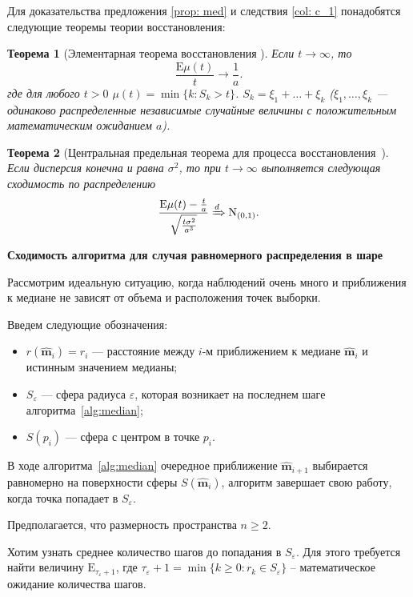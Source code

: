 \documentclass[specialist,
substylefile = spbu.rtx,
               subf,href,colorlinks=true, 12pt]{disser}
\newtheorem{theorem}{Теорема}
\begin{document}
Для доказательства предложения \ref{prop: med} и следствия \ref{col: c_1} понадобятся следующие теоремы теории восстановления:

\begin{theorem}[Элементарная теорема восстановления \cite{Borovkov}]

Если  $t\to \infty$, то \[
\frac{\mathrm{E} \mu(t)}{t}\to \frac{1}{a}.
\]
где для любого $t > 0$ $\mu(t) =\min\{k : S_k > t\}$. $S_k = \xi_1 +\dots+ \xi_k$ ($\xi_1,\dots, \xi_k$ --- одинаково распределенные независимые случайные величины с положительным математическим ожиданием $a$).
\label{thm:е_1}
\end{theorem} 

\begin{theorem}[Центральная предельная теорема для процесса восстановления~\cite{Borovkov}]
Если дисперсия конечна и равна $\sigma^2$, то при $t\to \infty$ выполняется следующая сходимость по распределению
\[
\frac{\mathrm{E} \mu(t) - \frac{t}{a}}{\sqrt{\frac{t\sigma^2}{a^3}}}\xRightarrow{d} \mathrm{N}_{(0,1)}.
\]
\label{thm:е_2}
\end{theorem}

\textbf{Сходимость алгоритма для случая равномерного распределения в шаре}

Рассмотрим идеальную ситуацию, когда наблюдений очень много и приближения к медиане не зависят от объема и расположения точек выборки. 

Введем следующие обозначения:
\begin{itemize}
    \item $r(\widehat{\mathbf{m}}_i)=r_i$ --- расстояние между $i$-м приближением к медиане $\widehat{\mathbf{m}}_i$ и истинным значением медианы;
   \item $S_\varepsilon$ --- сфера радиуса $\varepsilon$, которая возникает на последнем шаге алгоритма~\ref{alg:median};
   \item $S(p_i)$ --- сфера с центром в точке $p_i$.
\end{itemize}

В ходе алгоритма~\ref{alg:median} очередное приближение $\widehat{\mathbf{m}}_{i+1}$ выбирается равномерно на поверхности сферы $S(\widehat{\mathbf{m}}_i)$, алгоритм завершает свою работу, когда точка попадает в $S_\varepsilon$.

Предполагается, что  размерность пространства $n\geqslant 2.$

Хотим узнать среднее количество шагов до попадания в $S_\varepsilon$. 
Для этого требуется найти величину $\mathrm{E}_{\tau_{\varepsilon} +1}$, где $\tau_{\varepsilon} + 1 = \min\{k \geqslant  0 : r_k \in S_\varepsilon\}$ -- математическое ожидание количества шагов.
\end{document}
